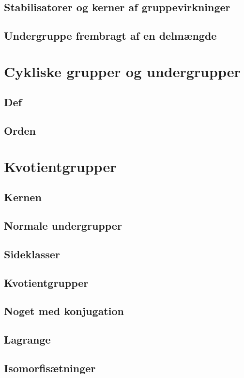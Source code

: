 \documentclass[11pt]{article}
\begin{document}
\subsection*{Stabilisatorer og kerner af gruppevirkninger}
\subsection*{Undergruppe frembragt af en delmængde}

\section*{Cykliske grupper og undergrupper}
\subsection*{Def}
\subsection*{Orden}

\section*{Kvotientgrupper}
\subsection*{Kernen}
\subsection*{Normale undergrupper}
\subsection*{Sideklasser}
\subsection*{Kvotientgrupper}
\subsection*{Noget med konjugation}
\subsection*{Lagrange}
\subsection*{Isomorfisætninger}
\end{document}
